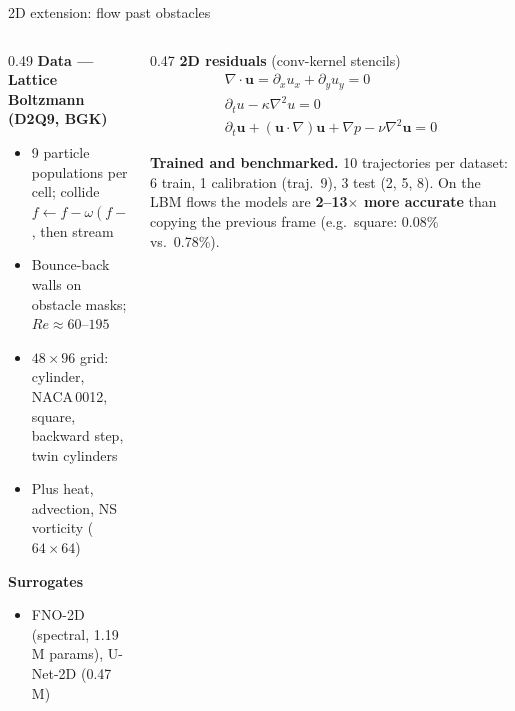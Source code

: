 \documentclass[aspectratio=169,11pt]{beamer}
\begin{document}
\begin{frame}{2D extension: flow past obstacles}
\begin{columns}[T]
\begin{column}{0.49\textwidth}
\textbf{Data --- Lattice Boltzmann (D2Q9, BGK)}
\begin{itemize}\small\setlength{\itemsep}{1pt}
\item 9 particle populations per cell; collide $f\leftarrow f-\omega(f-f^{eq})$, then stream
\item Bounce-back walls on obstacle masks; $Re\approx 60$--$195$
\item $48\times96$ grid: cylinder, NACA\,0012, square, backward step, twin cylinders
\item Plus heat, advection, NS vorticity ($64\times64$)
\end{itemize}
\textbf{Surrogates}
\begin{itemize}\small\setlength{\itemsep}{1pt}
\item FNO-2D (spectral, 1.19\,M params), U-Net-2D (0.47\,M)
\end{itemize}
\end{column}
\begin{column}{0.47\textwidth}
\textbf{2D residuals} (conv-kernel stencils)
{\small\[\begin{gathered}
\nabla\cdot\mathbf u=\partial_x u_x+\partial_y u_y=0\\
\partial_t u-\kappa\nabla^2u=0\\
\partial_t\mathbf u+(\mathbf u\cdot\nabla)\mathbf u+\nabla p-\nu\nabla^2\mathbf u=0
\end{gathered}\]}
\begin{idea}
\textbf{Trained and benchmarked.} 10 trajectories per dataset: 6 train, 1 calibration (traj.\ 9), 3 test (2, 5, 8). On the LBM flows the models are \textbf{2--13$\times$ more accurate} than copying the previous frame (e.g.\ square: 0.08\% vs.\ 0.78\%).
\end{idea}
\end{column}
\end{columns}
\end{frame}
\end{document}
